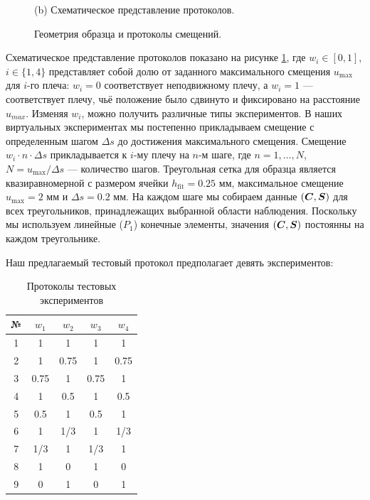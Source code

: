 \begin{figure}[H]
{\begin{minipage}[c]{0.45\textwidth}
      \small (b) Схематическое представление протоколов. 
    \end{minipage}%
  }
  \caption{Геометрия образца и протоколы смещений.}
  \label{fig:malt_geometry}
  \label{fig:malt_displacements}
\end{figure}

Схематическое представление протоколов показано на рисунке \ref{fig:malt_displacements}, где $w_i \in [0,1]$, $i \in \{1,4\}$
представляет собой долю от заданного максимального смещения $u_{\max}$ для $i$-го плеча: $w_i = 0$ 
соответствует неподвижному плечу, а $w_i = 1$ — соответствует плечу, чьё положение было сдвинуто и фиксировано на расстояние $u_{max}$. 
Изменяя $w_i$, можно получить различные типы экспериментов. 
В наших виртуальных экспериментах мы постепенно 
прикладываем смещение с определенным шагом $\Delta s$ до достижения максимального смещения. 
Смещение $w_i \cdot n \cdot \Delta s$ прикладывается к $i$-му плечу на $n$-м шаге, где $n = 1, \ldots, N$, 
$N = u_{\max}/\Delta s$ — количество шагов. 
Треугольная сетка для образца является квазиравномерной с размером ячейки $h_{\text{fit}} = 0.25$ мм, максимальное смещение 
$u_{\max} = 2$ мм и $\Delta s = 0.2$ мм. 
На каждом шаге мы собираем данные $(\boldsymbol{C}, \boldsymbol{S})$ для всех треугольников, принадлежащих выбранной области наблюдения. 
Поскольку мы используем линейные ($P_1$) конечные элементы, значения $(\boldsymbol{C}, \boldsymbol{S})$ постоянны на каждом треугольнике.

 
 
Наш предлагаемый тестовый протокол предполагает девять экспериментов:

\begin{table}[H]
\centering
\caption{Протоколы тестовых экспериментов}
\label{tab:test_protocols}
\begin{tabular}{|c|c|c|c|c|}
\hline
\textbf{№} & $w_1$ & $w_2$ & $w_3$ & $w_4$ \\
\hline
1 & 1 & 1 & 1 & 1 \\
2 & 1 & 0.75 & 1 & 0.75 \\
3 & 0.75 & 1 & 0.75 & 1 \\
4 & 1 & 0.5 & 1 & 0.5 \\
5 & 0.5 & 1 & 0.5 & 1 \\
6 & 1 & 1/3 & 1 & 1/3 \\
7 & 1/3 & 1 & 1/3 & 1 \\
8 & 1 & 0 & 1& 0 \\
9 & 0 & 1 & 0 & 1 \\
\hline
\end{tabular}
\end{table}

